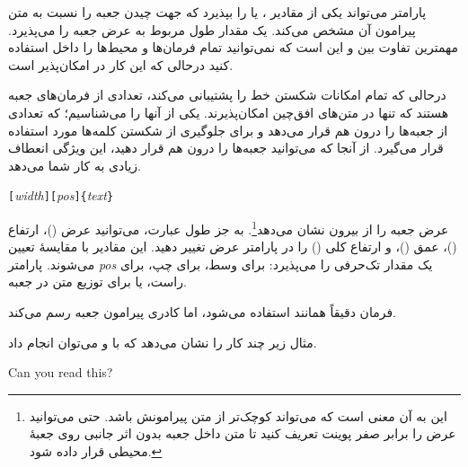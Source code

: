 \noindent پارامتر  می‌تواند یکی از مقادیر 
،  یا  را بپذیرد که جهت چیدن جعبه را نسبت به متن پیرامون آن مشخص می‌کند.  یک مقدار طول مربوط به عرض جعبه را می‌پذیرد. مهمترین تفاوت بین   و   این است که نمی‌توانید تمام فرمان‌ها و محیط‌ها را داخل   استفاده کنید درحالی که این کار در   امکان‌پذیر است.

درحالی که  تمام امکانات شکستن خط را پشتیبانی می‌کند، تعدادی از فرمان‌های جعبه هستند که تنها در متن‌های افق‌چین امکان‌پذیرند. یکی از آنها را می‌شناسیم؛   که تعدادی از جعبه‌ها را درون هم قرار می‌دهد و برای جلوگیری از شکستن کلمه‌ها مورد استفاده قرار می‌گیرد. از آنجا  که می‌توانید جعبه‌ها را درون هم قرار دهید، این ویژگی انعطاف زیادی به کار شما می‌دهد.


\begin{lscommand}
\verb|[|\emph{width}\verb|][|\emph{pos}\verb|]{|\emph{text}\verb|}|
\end{lscommand}


\noindent {} عرض جعبه را از بیرون نشان می‌دهد\footnote{این به آن معنی است که می‌تواند کوچک‌تر از متن پیرامونش باشد. حتی می‌توانید عرض را برابر صفر پوینت تعریف کنید تا متن داخل جعبه بدون اثر جانبی روی جعبهٔ محیطی  قرار داده شود.}.  
به جز طول عبارت، می‌توانید 
عرض 
()، ارتفاع
()، عمق
()، و ارتفاع کلی
()
 را در پارامتر عرض تغییر دهید. این مقادیر با مقایسهٔ  
تعیین می‌شوند. پارامتر 
 \emph{pos} یک مقدار تک‌حرفی را می‌پذیرد:   برای وسط،  برای چپ،  برای راست، یا  برای توزیع متن در جعبه.

فرمان  دقیقاً همانند  استفاده می‌شود، اما کادری پیرامون جعبه رسم می‌کند.

مثال زیر چند کار را نشان می‌دهد که  با   و   می‌توان انجام داد.


\begin{example}
\par
{}\par
{} \par
{} \par
{} 
Can you read this?
\end{example}


